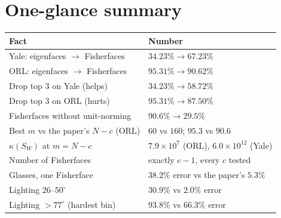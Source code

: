 \documentclass[11pt]{article}
\begin{document}
\section{One-glance summary}

\begin{center}
\begin{tabular}{ll}\toprule
Fact & Number\\\midrule
Yale: eigenfaces $\to$ Fisherfaces & $34.23\% \to 67.23\%$\\
ORL: eigenfaces $\to$ Fisherfaces & $95.31\% \to 90.62\%$\\
Drop top 3 on Yale (helps) & $34.23\% \to 58.72\%$\\
Drop top 3 on ORL (hurts) & $95.31\% \to 87.50\%$\\
Fisherfaces without unit-norming & $90.6\% \to 29.5\%$\\
Best $m$ vs the paper's $N-c$ (ORL) & $60$ vs $160$; $95.3$ vs $90.6$\\
$\kappa(S_W)$ at $m=N-c$ & $7.9\times10^{7}$ (ORL), $6.0\times10^{12}$ (Yale)\\
Number of Fisherfaces & exactly $c-1$, every $c$ tested\\
Glasses, one Fisherface & $38.2\%$ error vs the paper's $5.3\%$\\
Lighting $26$--$50^\circ$ & $30.9\%$ vs $2.0\%$ error\\
Lighting $>77^\circ$ (hardest bin) & $93.8\%$ vs $66.3\%$ error\\\bottomrule
\end{tabular}
\end{center}
\end{document}
